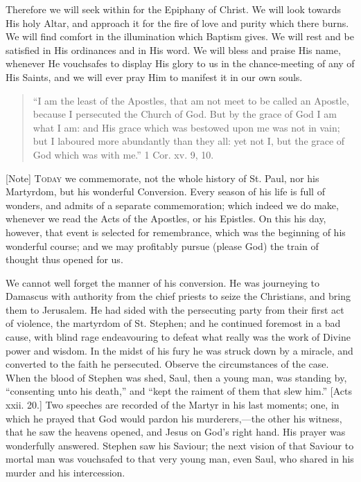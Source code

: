 Therefore we will seek within for the Epiphany of Christ. We will
look towards His holy Altar, and approach it for the fire of love and
purity which there burns. We will find comfort in the illumination
which Baptism gives. We will rest and be satisfied in His ordinances
and in His word. We will bless and praise His name, whenever He
vouchsafes to display His glory to us in the chance-meeting of any of
His Saints, and we will ever pray Him to manifest it in our own souls.


\begin{quote}

``I am the least of the Apostles, that am not meet to be
called an Apostle, because I persecuted the Church of God. But by
the grace of God I am what I am: and His grace which was bestowed
upon me was not in vain; but I laboured more abundantly than they
all: yet not I, but the grace of God which was with me.'' 1 Cor.
xv. 9, 10.

\end{quote}

[Note] T\textsc{oday} we commemorate, not
the whole history of St. Paul, nor his Martyrdom, but his wonderful
Conversion. Every season of his life is full of wonders, and admits of
a separate commemoration; which indeed we do make, whenever we read
the Acts of the Apostles, or his Epistles. On this his day, however,
that event is selected for remembrance, which was the beginning of his
wonderful course; and we may profitably pursue (please God) the train
of thought thus opened for us.

We cannot well forget the manner of his conversion. He was
journeying to Damascus with authority from the chief priests to seize
the Christians, and bring them to Jerusalem. He had sided with the
persecuting party from their first act of violence, the martyrdom of
St. Stephen; and he continued foremost in a bad cause, with blind rage
endeavouring to defeat what really was the work of Divine power and
wisdom. In the midst of his fury he was struck down by a miracle, and
converted to the faith he persecuted. Observe the circumstances of the
case. When the blood of Stephen was shed, Saul, then a young man, was
standing by, ``consenting unto his death,'' and ``kept the
raiment of them that slew him.'' [Acts xxii. 20.] Two speeches are
recorded of the Martyr in his last moments; one, in which he prayed
that God would pardon his murderers,—the other his witness, that he
saw the heavens opened, and Jesus on God's right hand. His prayer was
wonderfully answered. Stephen saw his Saviour; the next vision of that
Saviour to mortal man was vouchsafed to that very young man, even
Saul, who shared in his murder and his intercession.

